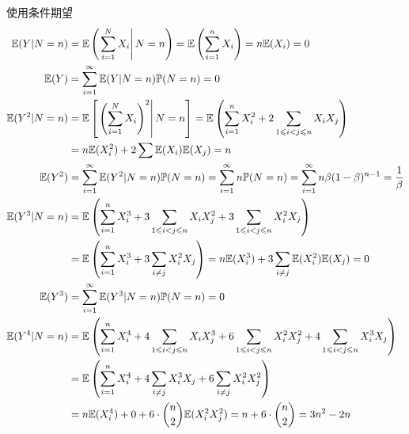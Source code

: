 \begin{solution}[2]
	使用条件期望
	\[\begin{aligned}
			\E(Y|N=n)   & = \E\left(\left.\sum_{i=1}^{N}X_i\right|N=n\right)=\E\left(\sum_{i=1}^{n}X_i\right) = n\E(X_i) =0                                                                       \\
			\E(Y)       & = \sum_{i=1}^{\infty}\E(Y|N=n)\p(N=n) = 0                                                                                                                               \\
			\E(Y^2|N=n) & = \E\left[\left.\left(\sum_{i=1}^{N}X_i\right)^2\right|N=n\right] = \E\left(\sum_{i=1}^{n}X_i^2+2\sum_{1\leqslant i<j\leqslant n}X_i X_j\right)                         \\
			            & = n\E(X_i^2)+2\sum \E(X_i)\E(X_j) = n                                                                                                                                   \\
			\E(Y^2)     & = \sum_{i=1}^{\infty}\E(Y^2|N=n)\p(N=n) = \sum_{i=1}^{\infty}n\p(N=n) = \sum_{i=1}^{\infty}n\beta (1-\beta )^{n-1} = \frac{1}{\beta}                                    \\
			\E(Y^3|N=n) & = \E\left(\sum_{i=1}^{n}X_i^3+3\sum_{1\leqslant i<j\leqslant n}X_i X_j^2+3\sum_{1\leqslant i<j\leqslant n}X_i^2 X_j\right)                                              \\
			            & = \E\left(\sum_{i=1}^{n}X_i^3 +3\sum_{i\neq j}X_i^2 X_j\right) = n\E(X_i^3) +3\sum_{i\neq j}\E(X_i^2)\E(X_j) = 0                                                        \\
			\E(Y^3)     & = \sum_{i=1}^{\infty}\E(Y^3|N=n)\p(N=n) = 0                                                                                                                             \\
			\E(Y^4|N=n) & = \E\left(\sum_{i=1}^{n}X_i^4+4\sum_{1\leqslant i<j\leqslant n}X_i X_j^3+6\sum_{1\leqslant i<j\leqslant n}X_i^2 X_j^2+4\sum_{1\leqslant i<j\leqslant n}X_i^3 X_j\right) \\
			            & = \E\left(\sum_{i=1}^{n}X_i^4 + 4\sum_{i\neq j}X_i^3 X_j + 6\sum_{i\neq j}X_i^2 X_j^2\right)                                                                            \\
			            & = n\E(X_i^4) + 0 + 6\cdot \binom{n}{2}\E(X_i^2 X_j^2) = n + 6\cdot \binom{n}{2} = 3n^2 - 2n                                                                             \\

\end{aligned}\]
\end{solution}
